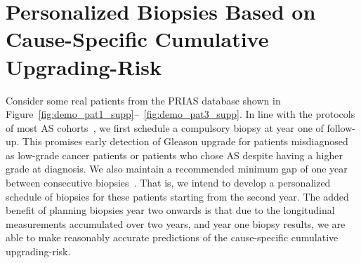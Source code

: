 \section{Personalized Biopsies Based on Cause-Specific Cumulative Upgrading-Risk}
Consider some real patients from the PRIAS database shown in Figure~\ref{fig:demo_pat1_supp}--~\ref{fig:demo_pat3_supp}. In line with the protocols of most AS cohorts~\citep{nieboer2018active}, we first schedule a compulsory biopsy at year one of follow-up. This promises early detection of Gleason upgrade for patients misdiagnosed as low-grade cancer patients or patients who chose AS despite having a higher grade at diagnosis. We also maintain a recommended minimum gap of one year between consecutive biopsies~\citep{bokhorst2015compliance}. That is, we intend to develop a personalized schedule of biopsies for these patients starting from the second year. The added benefit of planning biopsies year two onwards is that due to the longitudinal measurements accumulated over two years, and year one biopsy results, we are able to make reasonably accurate predictions of the cause-specific cumulative upgrading-risk. 

